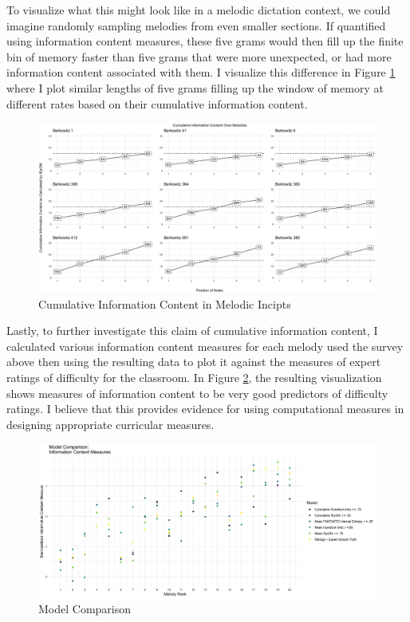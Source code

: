 \documentclass[12pt,]{book}
\begin{document}
To visualize what this might look like in a melodic dictation context, we could imagine randomly sampling melodies from even smaller sections.
If quantified using information content measures, these five grams would then fill up the finite bin of memory faster than five grams that were more unexpected, or had more information content associated with them.
I visualize this difference in Figure \ref{fig:cumplot} where I plot similar lengths of five grams filling up the window of memory at different rates based on their cumulative information content.

\begin{figure}

{\centering \includegraphics[width=1\linewidth]{img/cum_grid_plot} 

}

\caption{Cumulative Information Content in Melodic Incipts}\label{fig:cumplot}
\end{figure}

Lastly, to further investigate this claim of cumulative information content, I calculated various information content measures for each melody used the survey above then using the resulting data to plot it against the measures of expert ratings of difficulty for the classroom.
In Figure \ref{fig:modelcomparison}, the resulting visualization shows measures of information content to be very good predictors of difficulty ratings.
I believe that this provides evidence for using computational measures in designing appropriate curricular measures.

\begin{figure}

{\centering \includegraphics[width=1\linewidth]{img/model_comparsion_gg} 

}

\caption{Model Comparison}\label{fig:modelcomparison}
\end{figure}
\end{document}
